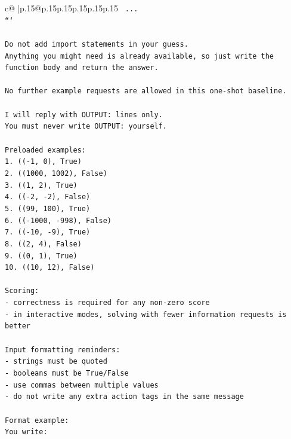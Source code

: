 \documentclass{article}
\begin{document}
{\begin{supertabular}{c@{$\;$}|p{.15\linewidth}@{}p{.15\linewidth}p{.15\linewidth}p{.15\linewidth}p{.15\linewidth}p{.15\linewidth}}
{{{\texttt{    ...} \\
\texttt{```} \\
\\ 
\texttt{Do not add import statements in your guess.} \\
\texttt{Anything you might need is already available, so just write the function body and return the answer.} \\
\\ 
\texttt{No further example requests are allowed in this one{-}shot baseline.} \\
\\ 
\texttt{I will reply with OUTPUT: lines only.} \\
\texttt{You must never write OUTPUT: yourself.} \\
\\ 
\texttt{Preloaded examples:} \\
\texttt{1. (({-}1, 0), True)} \\
\texttt{2. ((1000, 1002), False)} \\
\texttt{3. ((1, 2), True)} \\
\texttt{4. (({-}2, {-}2), False)} \\
\texttt{5. ((99, 100), True)} \\
\texttt{6. (({-}1000, {-}998), False)} \\
\texttt{7. (({-}10, {-}9), True)} \\
\texttt{8. ((2, 4), False)} \\
\texttt{9. ((0, 1), True)} \\
\texttt{10. ((10, 12), False)} \\
\\ 
\texttt{Scoring:} \\
\texttt{{-} correctness is required for any non{-}zero score} \\
\texttt{{-} in interactive modes, solving with fewer information requests is better} \\
\\ 
\texttt{Input formatting reminders:} \\
\texttt{{-} strings must be quoted} \\
\texttt{{-} booleans must be True/False} \\
\texttt{{-} use commas between multiple values} \\
\texttt{{-} do not write any extra action tags in the same message} \\
\\ 
\texttt{Format example:} \\
\texttt{You write:} \\
}}}
\end{supertabular}}
\end{document}
